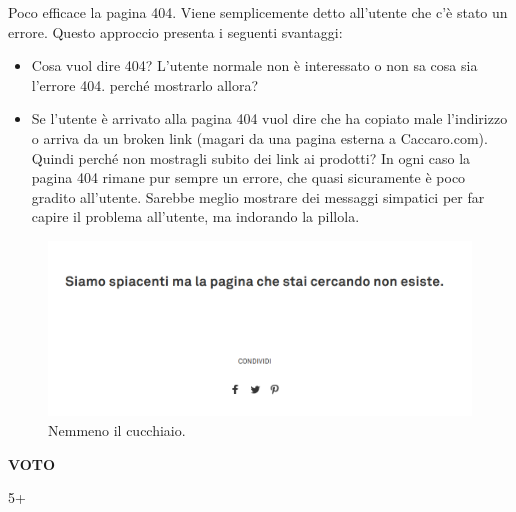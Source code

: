 Poco efficace la pagina 404. Viene semplicemente detto all'utente che c'è stato un errore. Questo approccio presenta i seguenti svantaggi:
\begin{itemize}
	\item Cosa vuol dire 404? L'utente normale non è interessato o non sa cosa sia l'errore 404. perché mostrarlo allora?
	\item Se l'utente è arrivato alla pagina 404 vuol dire che ha copiato male l'indirizzo o arriva da un broken link (magari da una pagina esterna a Caccaro.com). Quindi perché non mostragli subito dei link ai prodotti? In ogni caso la pagina 404 rimane pur sempre un errore, che quasi sicuramente è poco gradito all'utente. Sarebbe meglio mostrare dei messaggi simpatici per far capire il problema all'utente, ma indorando la pillola.
\end{itemize}

\begin{figure}[H]
	\centering
	\includegraphics[width=\textwidth ,keepaspectratio]{sez/Varie/img/404.png}
	\caption{Nemmeno il cucchiaio.}
\end{figure}

\begin{center}
\begin{Large}
\textbf{VOTO}\\
\vspace{0.1cm}
\end{Large}
\begin{huge}
5+
\end{huge}
\end{center}
